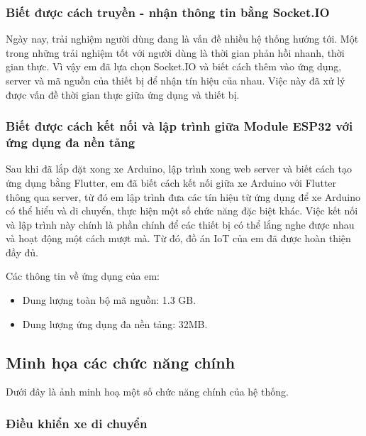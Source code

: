 \documentclass[../DoAn.tex]{subfiles}
\begin{document}
\subsubsection{Biết được cách truyền - nhận thông tin bằng Socket.IO}

Ngày nay, trải nghiệm người dùng đang là vấn đề nhiều hệ thống hướng tới. Một trong những trải nghiệm tốt với người dùng là thời gian phản hồi nhanh, thời gian thực. Vì vậy em đã lựa chọn Socket.IO và biết cách thêm vào ứng dụng, server và mã nguồn của thiết bị để nhận tín hiệu của nhau. Việc này đã xử lý được vấn đề thời gian thực giữa ứng dụng và thiết bị. 

\subsubsection{Biết được cách kết nối và lập trình giữa Module ESP32 với ứng dụng đa nền tảng}

Sau khi đã lắp đặt xong xe Arduino, lập trình xong web server và biết cách tạo ứng dụng bằng Flutter, em đã biết cách kết nối giữa xe Arduino với Flutter thông qua server, từ đó em lập trình đưa các tín hiệu từ ứng dụng để xe Arduino có thể hiểu và di chuyển, thực hiện một số chức năng đặc biệt khác. Việc kết nối và lập trình này chính là phần chính để các thiết bị có thể lắng nghe được nhau và hoạt động một cách mượt mà. Từ đó, đồ án IoT của em đã được hoàn thiện đầy đủ.


Các thông tin về ứng dụng của em:
\begin{itemize}
    \item Dung lượng toàn bộ mã nguồn: 1.3 GB.
    \item Dung lượng ứng dụng đa nền tảng: 32MB.
\end{itemize}

\subsection{Minh họa các chức năng chính}

Dưới đây là ảnh minh hoạ một số chức năng chính của hệ thống.

\subsubsection{Điều khiển xe di chuyển}
\end{document}
